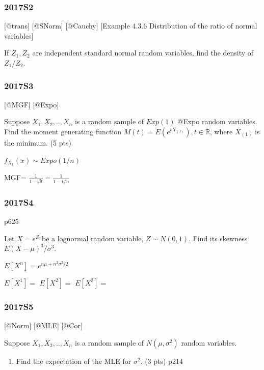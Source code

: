 \documentclass[6pt,Portrait]{article}
\providecommand{\tightlist}{%
  \setlength{\itemsep}{0pt}\setlength{\parskip}{0pt}}
\begin{document}
\hypertarget{s2-5}{%
\subsubsection{2017S2}\label{s2-5}}

{[}@trans{]} {[}@SNorm{]} {[}@Cauchy{]} {[}Example 4.3.6 Distribution of
the ratio of normal variables{]}

If \(Z_1,Z_2\) are independent standard normal random variables, find
the density of \(Z_1/Z_2\).

\hypertarget{s3-5}{%
\subsubsection{2017S3}\label{s3-5}}

{[}@MGF{]} {[}@Expo{]}

Suppose \(X_1,X_2,..,X_n\) is a random sample of \(Exp(1)\) @Expo random
variables. Find the moment generating function
\(M(t)=E(e^{tX_{(1)}}), t\in\mathbb R\), where \(X_{(1)}\) is the
minimum. (5 pts)

\(f_{X_{1}}(x)\sim Expo(1/n)\)

MGF= \(\frac1{1-\beta t}=\frac1{1-t/n}\)

\hypertarget{s4-5}{%
\subsubsection{2017S4}\label{s4-5}}

p625

Let \(X=e^Z\) be a lognormal random variable, \(Z\sim N(0,1)\). Find its
skewness \(E(X-\mu)^3/\sigma^3\).

\(E[X^n]=e^{n\mu+n^2\sigma^2/2}\)

\(E[X^1]=\) \(E[X^2]=\) \(E[X^3]=\)

\hypertarget{s5-5}{%
\subsubsection{2017S5}\label{s5-5}}

{[}@Norm{]} {[}@MLE{]} {[}@Cor{]}

Suppose \(X_1,X_2,..,X_n\) is a random sample of \(N(\mu,\sigma^2)\)
random variables.

\begin{enumerate}
\def\labelenumi{(\alph{enumi})}
\tightlist
\item
  Find the expectation of the MLE for \(\sigma^2\). (3 pts) p214
\end{enumerate}
\end{document}
